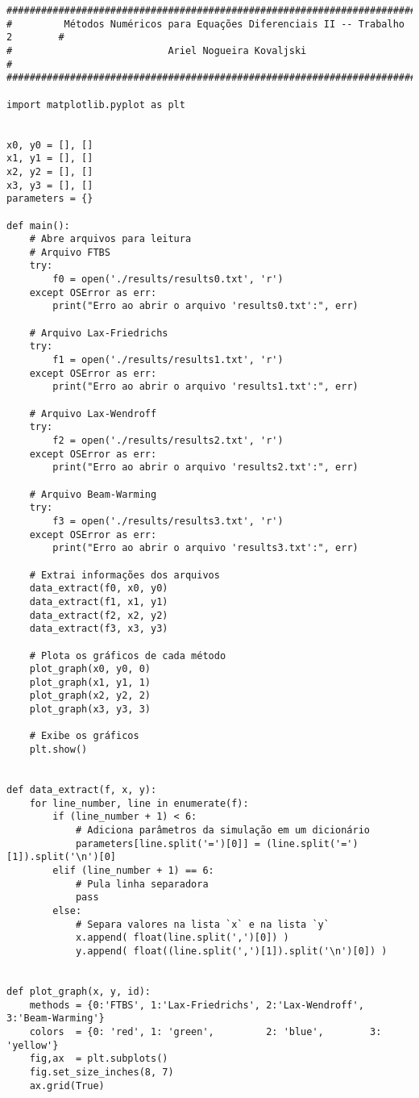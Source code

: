 \begin{Verbatim}[fontsize=\footnotesize]
################################################################################
#         Métodos Numéricos para Equações Diferenciais II -- Trabalho 2        #
#                           Ariel Nogueira Kovaljski                           #
################################################################################

import matplotlib.pyplot as plt


x0, y0 = [], []
x1, y1 = [], []
x2, y2 = [], []
x3, y3 = [], []
parameters = {}

def main():
    # Abre arquivos para leitura
    # Arquivo FTBS
    try:
        f0 = open('./results/results0.txt', 'r')
    except OSError as err:
        print("Erro ao abrir o arquivo 'results0.txt':", err)

    # Arquivo Lax-Friedrichs
    try:
        f1 = open('./results/results1.txt', 'r')
    except OSError as err:
        print("Erro ao abrir o arquivo 'results1.txt':", err)

    # Arquivo Lax-Wendroff
    try:
        f2 = open('./results/results2.txt', 'r')
    except OSError as err:
        print("Erro ao abrir o arquivo 'results2.txt':", err)

    # Arquivo Beam-Warming
    try:
        f3 = open('./results/results3.txt', 'r')
    except OSError as err:
        print("Erro ao abrir o arquivo 'results3.txt':", err)

    # Extrai informações dos arquivos
    data_extract(f0, x0, y0)
    data_extract(f1, x1, y1)
    data_extract(f2, x2, y2)
    data_extract(f3, x3, y3)

    # Plota os gráficos de cada método
    plot_graph(x0, y0, 0)
    plot_graph(x1, y1, 1)
    plot_graph(x2, y2, 2)
    plot_graph(x3, y3, 3)

    # Exibe os gráficos
    plt.show()


def data_extract(f, x, y):
    for line_number, line in enumerate(f):
        if (line_number + 1) < 6:
            # Adiciona parâmetros da simulação em um dicionário
            parameters[line.split('=')[0]] = (line.split('=')[1]).split('\n')[0]
        elif (line_number + 1) == 6:
            # Pula linha separadora
            pass
        else:
            # Separa valores na lista `x` e na lista `y`
            x.append( float(line.split(',')[0]) )
            y.append( float((line.split(',')[1]).split('\n')[0]) )


def plot_graph(x, y, id):
    methods = {0:'FTBS', 1:'Lax-Friedrichs', 2:'Lax-Wendroff', 3:'Beam-Warming'}
    colors  = {0: 'red', 1: 'green',         2: 'blue',        3: 'yellow'}
    fig,ax  = plt.subplots()
    fig.set_size_inches(8, 7)
    ax.grid(True)


\end{Verbatim}
